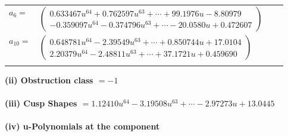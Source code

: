\documentclass[1p]{elsarticle_modified}
\theoremstyle{definition}
\begin{document}
\begin{tabular}{m{7pt} m{180pt} m{7pt} m{180pt} }
\flushright $a_{6}=$&$\begin{pmatrix}0.633467 u^{64}+0.762597 u^{63}+\cdots+99.1976 u-8.80979\\-0.359097 u^{64}-0.374796 u^{63}+\cdots-20.0580 u+0.472607\end{pmatrix}$ \\
\flushright $a_{10}=$&$\begin{pmatrix}0.648781 u^{64}-2.39549 u^{63}+\cdots+0.850744 u+17.0104\\2.20379 u^{64}-2.48811 u^{63}+\cdots+37.1721 u+0.459690\end{pmatrix}$\\&\end{tabular}
\flushleft \textbf{(ii) Obstruction class $= -1$}\\~\\
\flushleft \textbf{(iii) Cusp Shapes $= 1.12410 u^{64}-3.19508 u^{63}+\cdots-2.97273 u+13.0445$}\\~\\
\newpage\renewcommand{\arraystretch}{1}
\flushleft \textbf{(iv) u-Polynomials at the component}\newline \\
\end{document}
